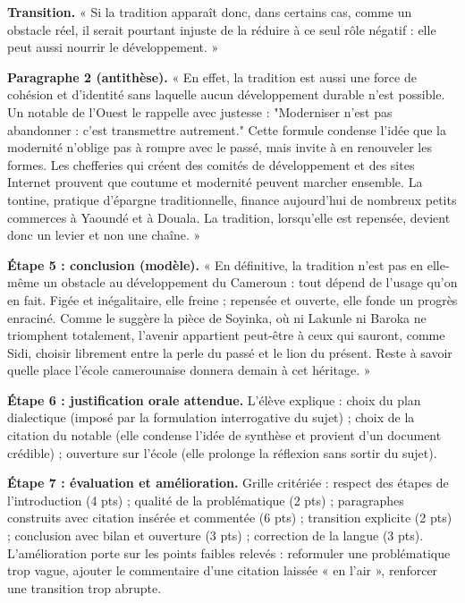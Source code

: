 \documentclass[11pt]{article}
\begin{document}
\begin{exoresolu}
\textbf{Transition.} « Si la tradition apparaît donc, dans certains cas, comme un obstacle réel, il serait pourtant injuste de la réduire à ce seul rôle négatif : elle peut aussi nourrir le développement. »

\textbf{Paragraphe 2 (antithèse).} « En effet, la tradition est aussi une force de cohésion et d'identité sans laquelle aucun développement durable n'est possible. Un notable de l'Ouest le rappelle avec justesse : "Moderniser n'est pas abandonner : c'est transmettre autrement." Cette formule condense l'idée que la modernité n'oblige pas à rompre avec le passé, mais invite à en renouveler les formes. Les chefferies qui créent des comités de développement et des sites Internet prouvent que coutume et modernité peuvent marcher ensemble. La tontine, pratique d'épargne traditionnelle, finance aujourd'hui de nombreux petits commerces à Yaoundé et à Douala. La tradition, lorsqu'elle est repensée, devient donc un levier et non une chaîne. »

\textbf{Étape 5 : conclusion (modèle).} « En définitive, la tradition n'est pas en elle-même un obstacle au développement du Cameroun : tout dépend de l'usage qu'on en fait. Figée et inégalitaire, elle freine ; repensée et ouverte, elle fonde un progrès enraciné. Comme le suggère la pièce de Soyinka, où ni Lakunle ni Baroka ne triomphent totalement, l'avenir appartient peut-être à ceux qui sauront, comme Sidi, choisir librement entre la perle du passé et le lion du présent. Reste à savoir quelle place l'école camerounaise donnera demain à cet héritage. »

\textbf{Étape 6 : justification orale attendue.} L'élève explique : choix du plan dialectique (imposé par la formulation interrogative du sujet) ; choix de la citation du notable (elle condense l'idée de synthèse et provient d'un document crédible) ; ouverture sur l'école (elle prolonge la réflexion sans sortir du sujet).

\textbf{Étape 7 : évaluation et amélioration.} Grille critériée : respect des étapes de l'introduction (4 pts) ; qualité de la problématique (2 pts) ; paragraphes construits avec citation insérée et commentée (6 pts) ; transition explicite (2 pts) ; conclusion avec bilan et ouverture (3 pts) ; correction de la langue (3 pts). L'amélioration porte sur les points faibles relevés : reformuler une problématique trop vague, ajouter le commentaire d'une citation laissée « en l'air », renforcer une transition trop abrupte.
\end{exoresolu}
\end{document}
